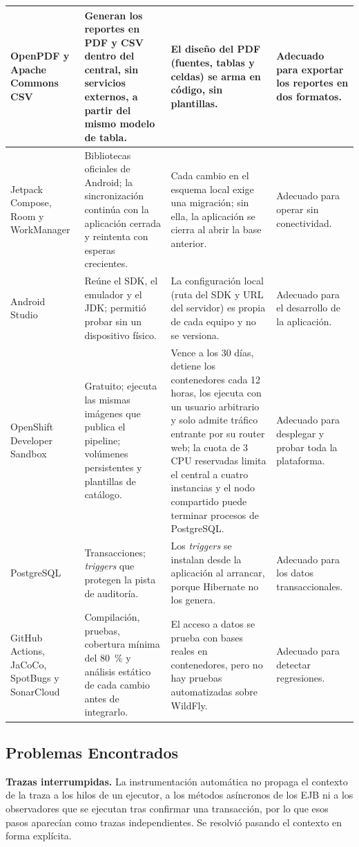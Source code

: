 {\begin{longtable}{|>{\raggedright\arraybackslash}p{2.2cm}|>{\raggedright\arraybackslash}p{3.4cm}|>{\raggedright\arraybackslash}p{3.4cm}|>{\raggedright\arraybackslash}p{2.2cm}|}
\hline
    OpenPDF y Apache Commons CSV & Generan los reportes en PDF y CSV dentro del central, sin servicios externos, a partir del mismo modelo de tabla. & El diseño del PDF (fuentes, tablas y celdas) se arma en código, sin plantillas. & Adecuado para exportar los reportes en dos formatos. \\
\hline
    Jetpack Compose, Room y WorkManager & Bibliotecas oficiales de Android; la sincronización continúa con la aplicación cerrada y reintenta con esperas crecientes. & Cada cambio en el esquema local exige una migración; sin ella, la aplicación se cierra al abrir la base anterior. & Adecuado para operar sin conectividad. \\
\hline
    Android Studio & Reúne el SDK, el emulador y el JDK; permitió probar sin un dispositivo físico. & La configuración local (ruta del SDK y URL del servidor) es propia de cada equipo y no se versiona. & Adecuado para el desarrollo de la aplicación. \\
\hline
    OpenShift Developer Sandbox & Gratuito; ejecuta las mismas imágenes que publica el pipeline; volúmenes persistentes y plantillas de catálogo. & Vence a los 30 días, detiene los contenedores cada 12 horas, los ejecuta con un usuario arbitrario y solo admite tráfico entrante por su router web; la cuota de 3 CPU reservadas limita el central a cuatro instancias y el nodo compartido puede terminar procesos de PostgreSQL. & Adecuado para desplegar y probar toda la plataforma. \\
\hline
    PostgreSQL & Transacciones; \textit{triggers} que protegen la pista de auditoría. & Los \textit{triggers} se instalan desde la aplicación al arrancar, porque Hibernate no los genera. & Adecuado para los datos transaccionales. \\
\hline
    GitHub Actions, JaCoCo, SpotBugs y SonarCloud & Compilación, pruebas, cobertura mínima del 80~\% y análisis estático de cada cambio antes de integrarlo. & El acceso a datos se prueba con bases reales en contenedores, pero no hay pruebas automatizadas sobre WildFly. & Adecuado para detectar regresiones. \\
\hline
\end{longtable}}


\subsection{Problemas Encontrados}

\textbf{Trazas interrumpidas.} La instrumentación automática no propaga el contexto de la traza a los hilos de un ejecutor, a los métodos asíncronos de los EJB ni a los observadores que se ejecutan tras confirmar una transacción, por lo que esos pasos aparecían como trazas independientes. Se resolvió pasando el contexto en forma explícita.

